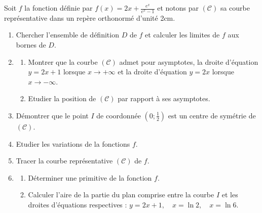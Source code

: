 \begin{exo}
      Soit $f$ la fonction d\'efinie par $f(x) = 2 x + \frac{e^x}{e^x - 1}$ et notons par $(\mathcal{C})$ sa courbe repr\'esentative dans un rep\`ere orthonorm\'e d'unit\'e 2cm.
      \begin{enumerate}
      \item Chercher l'ensemble de d\'efinition $D$ de $f$ et calculer les limites de $f$ aux bornes de $D$.
      \item 
            \begin{enumerate}
            \item Montrer que la courbe $(\mathcal{C})$ admet pour asymptotes, la droite d'\'equation $y = 2x + 1$ lorsque $x \rightarrow + \infty$ et la droite d'\'equation $y = 2x$ lorsque $x \rightarrow - \infty$.
            \item Etudier la position de $(\mathcal{C})$ par rapport \`a ses asymptotes.
            \end{enumerate}
      \item D\'emontrer que le point $I$ de coordonn\'ee $\left( 0 ; \frac{1}{2} \right)$ est un centre de sym\'etrie de $(\mathcal{C})$.
      \item Etudier les variations de la fonctions $f$.
      \item Tracer la courbe repr\'esentative $(\mathcal{C})$ de $f$.
      \item 
            \begin{enumerate}
            \item D\'eterminer une primitive de la fonction $f$.
            \item Calculer l'aire de la partie du plan comprise entre la courbe $I$ et les droites d'\'equations respectives : 
                  $ y = 2x + 1 , \quad x = \ln 2 , \quad x = \ln 6 $.
            \end{enumerate}
      \end{enumerate}
\end{exo}
